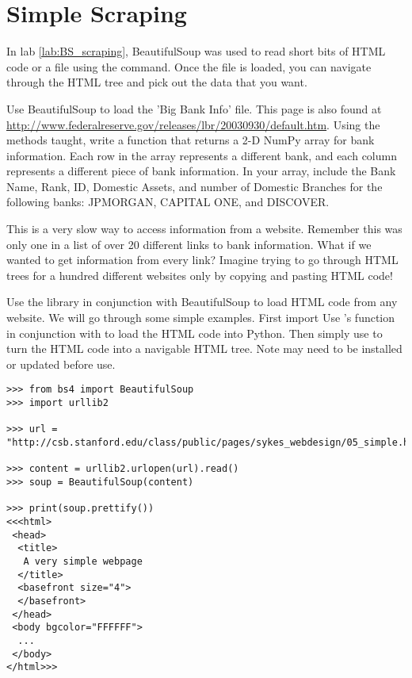 \section*{Simple Scraping}
In lab \ref{lab:BS_scraping}, BeautifulSoup was used to read short bits of HTML code or a file using the  command.
Once the file is loaded, you can navigate through the HTML tree and pick out the data that you want.

\begin{problem}
Use BeautifulSoup to load the 'Big Bank Info' file.
This page is also found at \url{http://www.federalreserve.gov/releases/lbr/20030930/default.htm}.
Using the methods taught, write a function that returns a 2-D NumPy array for bank information.
Each row in the array represents a different bank, and each column represents a different piece of bank information.
In your array, include the Bank Name, Rank, ID, Domestic Assets, and number of Domestic Branches for the following banks: JPMORGAN, CAPITAL ONE, and DISCOVER.
\end{problem}

This is a very slow way to access information from a website.
Remember this was only one in a list of over 20 different links to bank information.
What if we wanted to get information from every link?
Imagine trying to go through HTML trees for a hundred different websites only by copying and pasting HTML code!

Use the  library in conjunction with BeautifulSoup to load HTML code from any website.
We will go through some simple examples.
First import 
Use 's  function in conjunction with  to load the HTML code into Python.
Then simply use  to turn the HTML code into a navigable HTML tree. 
Note  may need to be installed or updated before use.

\begin{lstlisting}
>>> from bs4 import BeautifulSoup
>>> import urllib2

>>> url = "http://csb.stanford.edu/class/public/pages/sykes_webdesign/05_simple.html"

>>> content = urllib2.urlopen(url).read()
>>> soup = BeautifulSoup(content)

>>> print(soup.prettify())
<<<html>
 <head>
  <title>
   A very simple webpage
  </title>
  <basefront size="4">
  </basefront>
 </head>
 <body bgcolor="FFFFFF">
  ...
 </body>
</html>>>
\end{lstlisting}

